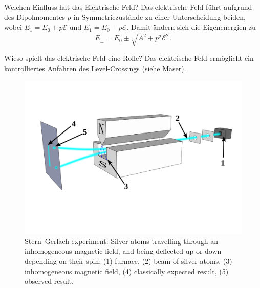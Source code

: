 
\begin{fquestion}{Welchen Einfluss hat das Elektrische Feld?}
    Das elektrische Feld führt aufgrund des Dipolmomentes $p$ in Symmetriezustände zu einer Unterscheidung beiden, wobei \(E_1 = E_0 + p \mathcal{E}\) und \(E_1 = E_0 - p \mathcal{E}\).
    Damit ändern sich die Eigenenergien zu
    \[E_\pm = E_0 \pm \sqrt{A^2 + p^2 \mathcal{E}^2}.\]
\end{fquestion}

\begin{fquestion}{Wieso spielt das elektrische Feld eine Rolle?}
    Das elektrische Feld ermöglicht ein kontrolliertes Anfahren des Level-Crossings (siehe Maser).
\end{fquestion}

\begin{figure}[H]
    \centering
    \includegraphics[width=0.9\linewidth]{img/Stern-Gerlach_experiment_svg.png}
    \caption{Stern–Gerlach experiment: Silver atoms travelling through an inhomogeneous magnetic field, and being deflected up or down depending on their spin; (1) furnace, (2) beam of silver atoms, (3) inhomogeneous magnetic field, (4) classically expected result, (5) observed result. }
    \label{fig:zustandsmischung:stern-gerlach}
\end{figure}

